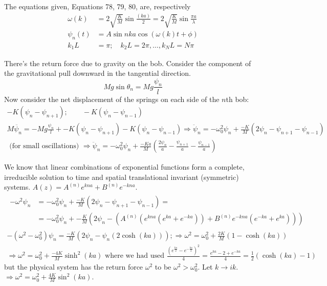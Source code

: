 \documentclass[twoside,10pt]{amsart}
\newcommand{\problemhead}[1]
  {\smallskip
   \noindent{\large\bf Problem #1.}
   \smallskip}
\begin{document}
\problemhead{2.24} The equations given, Equations 78, 79, 80, are, respectively
\begin{align*}
  \omega(k) & = 2 \sqrt{ \frac{K}{M} } \sin{ \frac{(ka)}{2} } = 2 \sqrt{ \frac{K}{M} }\sin{ \frac{\pi a}{ \lambda} } \\
    \psi_n(t) & = A \sin{ nka} \cos{ (\omega(k)t + \phi) } \\
    k_1 L & = \pi; \quad k_2 L = 2 \pi , \dots , k_N L = N \pi 
\end{align*}

\problemhead{2.26} There's the return force due to gravity on the bob.  Consider the component of the gravitational pull downward in the tangential direction.  
\[
Mg \sin{ \theta_n} = Mg \frac{ \psi_n}{ l} 
\]
Now consider the net displacement of the springs on each side of the $n$th bob:  
\[
\begin{gathered}
  -K( \psi_n - \psi_{n+1} ) ; \quad \quad -K (\psi_n - \psi_{n-1} ) \\
  M \ddot{\psi_n} = -Mg \frac{ \psi_n}{ l } + -K (\psi_n - \psi_{n+1} ) - K( \psi_n - \psi_{n-1} ) \Longrightarrow \ddot{\psi}_n  = -\omega_0^2 \psi_n + \frac{-K}{M} ( 2 \psi_n - \psi_{n+1} - \psi_{n-1} ) \\
  \text{ (for small oscillations) } \Longrightarrow \ddot{\psi}_n = -\omega_0^2 \psi_n + \frac{-Ka}{M} \left( \frac{ 2 \psi_n}{ a } - \frac{ \psi_{n+1}}{a} - \frac{ \psi_{n-1}}{ a} \right) 
\end{gathered}
\]

We know that linear combinations of exponential functions form a complete, irreducible solution to time and spatial translational invariant (symmetric) systems.  $A(z) = A^{(n)} e^{ kna} + B^{(n)} e^{-kna}$.  
\[
\begin{gathered}
\begin{aligned}
  -\omega^2 \psi_n & = -\omega_0^2 \psi_n + \frac{-K}{M} ( 2 \psi_n - \psi_{n+1} - \psi_{n-1} ) = \\
  & = -\omega_0^2 \psi_n + -\frac{K}{M} ( 2 \psi_n - (A^{(n)}(e^{kna} (e^{ka} + e^{-ka} ) ) +B^{(n)} e^{-kna} (e^{-ka} + e^{ka} ) ) ) 
\end{aligned} \\
  -(\omega^2 - \omega_0^2) \psi_n = \frac{-K}{M} ( 2 \psi_n - \psi_n( 2\cosh{(ka)} ) ); \Longrightarrow \omega^2 = \omega_0^2 + \frac{2K}{M} ( 1 - \cosh{ (ka) } ) \\
  \Longrightarrow \omega^2 = \omega_0^2 + \frac{-4K}{M} \sinh^2{(ka)} \text{ where we had used }
  \frac{ (e^{\frac{ka}{2}} - e^{-\frac{ka}{2} } )^2 }{ 4 } = \frac{ e^{ka} - 2 + e^{-ka}}{ 4} = \frac{1}{2} (\cosh{(ka)} - 1 ) 
\end{gathered}
\]
but the physical system has the return force $\omega^2$ to be $\omega^2 > \omega_0^2$.  Let $ k \to ik$.  \\
$\Longrightarrow \omega^2 = \omega_0^2 + \frac{4K}{M} \sin^2{(ka) }$.  
\end{document}
